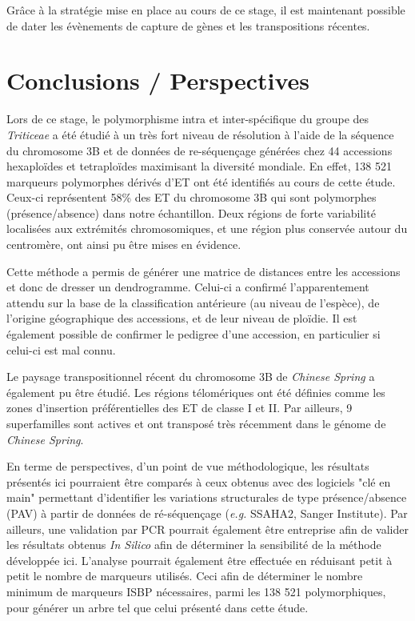 \documentclass[a4paper, 12pt]{article}
\begin{document}
\begin{onehalfspace}
Grâce à la stratégie mise en place au cours de ce stage, il est maintenant possible de dater les évènements de capture de gènes et les transpositions récentes.\\

\newpage
\thispagestyle{empty}
\null
\addtocounter{page}{-1}
\newpage


\part{Conclusions / Perspectives}
Lors de ce stage, le polymorphisme intra et inter-spécifique du groupe des \textit{Triticeae} a été étudié à un très fort niveau de résolution à l'aide de la séquence du chromosome 3B et de données de re-séquençage générées chez 44 accessions hexaploïdes et tetraploïdes maximisant la diversité mondiale. En effet, 138 521 marqueurs polymorphes dérivés d'ET ont été identifiés au cours de cette étude. Ceux-ci représentent 58\% des ET du chromosome 3B qui sont polymorphes (présence/absence) dans notre échantillon. Deux régions de forte variabilité localisées aux extrémités chromosomiques, et une région plus conservée autour du centromère, ont ainsi pu être mises en évidence.

Cette méthode a permis de générer une matrice de distances entre les accessions et donc de dresser un dendrogramme. Celui-ci a confirmé l'apparentement attendu sur la base de la classification antérieure (au niveau de l'espèce), de l'origine géographique des accessions, et de leur niveau de ploïdie. Il est également possible de confirmer le pedigree d'une accession, en particulier si celui-ci est mal connu.

Le paysage transpositionnel récent du chromosome 3B de \textit{Chinese Spring} a également pu être étudié. Les régions télomériques ont été définies comme les zones d'insertion préférentielles des ET de classe I et II. Par ailleurs, 9 superfamilles sont actives et ont transposé très récemment dans le génome de \textit{Chinese Spring}.

En terme de perspectives, d'un point de vue méthodologique, les résultats présentés ici pourraient être comparés à ceux obtenus avec des logiciels "clé en main" permettant d'identifier les variations structurales de type présence/absence (PAV) à partir de données de ré-séquençage (\textit{e.g.} SSAHA2, Sanger Institute). Par ailleurs, une validation par PCR pourrait également être entreprise afin de valider les résultats obtenus \textit{In Silico} afin de déterminer la sensibilité de la méthode développée ici. L'analyse pourrait également être effectuée en réduisant petit à petit le nombre de marqueurs utilisés. Ceci afin de déterminer le nombre minimum de marqueurs ISBP nécessaires, parmi les 138 521 polymorphiques, pour générer un arbre tel que celui présenté dans cette étude.


\end{onehalfspace}
\end{document}
